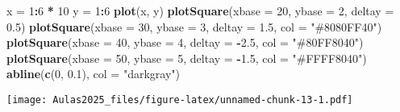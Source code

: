\documentclass[
]{book}
\newenvironment{Shaded}{\begin{snugshade}}{\end{snugshade}}
\newcommand{\AttributeTok}[1]{\textcolor[rgb]{0.13,0.29,0.53}{#1}}
\newcommand{\DecValTok}[1]{\textcolor[rgb]{0.00,0.00,0.81}{#1}}
\newcommand{\FloatTok}[1]{\textcolor[rgb]{0.00,0.00,0.81}{#1}}
\newcommand{\FunctionTok}[1]{\textcolor[rgb]{0.13,0.29,0.53}{\textbf{#1}}}
\newcommand{\NormalTok}[1]{#1}
\newcommand{\OtherTok}[1]{\textcolor[rgb]{0.56,0.35,0.01}{#1}}
\newcommand{\SpecialCharTok}[1]{\textcolor[rgb]{0.81,0.36,0.00}{\textbf{#1}}}
\newcommand{\StringTok}[1]{\textcolor[rgb]{0.31,0.60,0.02}{#1}}
\begin{document}
\begin{Shaded}
\begin{Highlighting}[]
\NormalTok{x }\OtherTok{=} \DecValTok{1}\SpecialCharTok{:}\DecValTok{6} \SpecialCharTok{*} \DecValTok{10}
\NormalTok{y }\OtherTok{=} \DecValTok{1}\SpecialCharTok{:}\DecValTok{6}
\FunctionTok{plot}\NormalTok{(x, y)}
\FunctionTok{plotSquare}\NormalTok{(}\AttributeTok{xbase =} \DecValTok{20}\NormalTok{, }\AttributeTok{ybase =} \DecValTok{2}\NormalTok{, }\AttributeTok{deltay =} \FloatTok{0.5}\NormalTok{)}
\FunctionTok{plotSquare}\NormalTok{(}\AttributeTok{xbase =} \DecValTok{30}\NormalTok{, }\AttributeTok{ybase =} \DecValTok{3}\NormalTok{, }\AttributeTok{deltay =} \FloatTok{1.5}\NormalTok{, }\AttributeTok{col =} \StringTok{"\#8080FF40"}\NormalTok{)}
\FunctionTok{plotSquare}\NormalTok{(}\AttributeTok{xbase =} \DecValTok{40}\NormalTok{, }\AttributeTok{ybase =} \DecValTok{4}\NormalTok{, }\AttributeTok{deltay =} \SpecialCharTok{{-}}\FloatTok{2.5}\NormalTok{, }\AttributeTok{col =} \StringTok{"\#80FF8040"}\NormalTok{)}
\FunctionTok{plotSquare}\NormalTok{(}\AttributeTok{xbase =} \DecValTok{50}\NormalTok{, }\AttributeTok{ybase =} \DecValTok{5}\NormalTok{, }\AttributeTok{deltay =} \SpecialCharTok{{-}}\FloatTok{1.5}\NormalTok{, }\AttributeTok{col =} \StringTok{"\#FFFF8040"}\NormalTok{)}
\FunctionTok{abline}\NormalTok{(}\FunctionTok{c}\NormalTok{(}\DecValTok{0}\NormalTok{, }\FloatTok{0.1}\NormalTok{), }\AttributeTok{col =} \StringTok{"darkgray"}\NormalTok{)}
\end{Highlighting}
\end{Shaded}

\texttt{[image: Aulas2025\_files/figure-latex/unnamed-chunk-13-1.pdf]}
\end{document}
